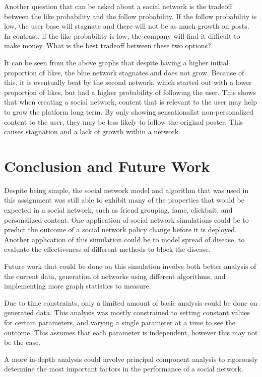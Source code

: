 \documentclass{article}
\begin{document}
Another question that can be asked about a social network is
the tradeoff between the like probability and the follow probability.
If the follow probability is low, the user base will stagnate and there will
not be as much growth on posts.
In contrast, if the like probability is low, the company will find it difficult
to make money. What is the best tradeoff between these two options?

It can be seen from the above graphs that despite having a higher initial
proportion of likes, the blue network stagnates and does not grow. Because of this,
it is eventually beat by the second network, which started out with a lower proportion
of likes, but had a higher probability of following the user.
This shows that when creating a social network, content that is relevant
to the user may help to grow the platform long term. By only showing
sensationalist non-personalized content to the user, they may be less likely to follow the original poster.
This causes stagnation and a lack of growth within a network.

\section{Conclusion and Future Work}
Despite being simple, the social network model and algorithm that was used
in this assignment was still able to exhibit many of the properties
that would be expected in a social network, such as friend grouping,
fame, clickbait, and personalized content.
One application of social network simulations could be to predict the outcome
of a social network policy change before it is deployed.
Another application of this simulation could be to model spread of disease, to evaluate the effectiveness
of different methods to block the disease.

Future work that could be done on this simulation involve both better
analysis of the current data, generation of networks using different algorithms,
and implementing more graph statistics to measure.

Due to time constraints, only a limited amount of basic analysis could be done
on generated data. This analysis was mostly constrained to setting constant values for certain
parameters, and varying a single parameter at a time to see the outcome.
This assumes that each parameter is independent, however this may not be the case.

A more in-depth analysis could involve principal component analysis to rigorously
determine the most important factors in the performance of a social network.
\end{document}
